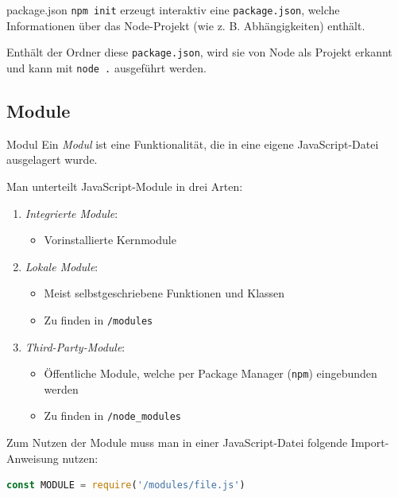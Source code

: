 \begin{defi}{package.json}
    \texttt{npm init} erzeugt interaktiv eine \texttt{package.json}, welche Informationen über das Node-Projekt (wie z. B. Abhängigkeiten) enthält.

    Enthält der Ordner diese \texttt{package.json}, wird sie von Node als Projekt erkannt und kann mit \texttt{node .} ausgeführt werden.
\end{defi}

\subsection{Module}

\begin{defi}{Modul}
    Ein \emph{Modul} ist eine Funktionalität, die in eine eigene JavaScript-Datei ausgelagert wurde.

    Man unterteilt JavaScript-Module in drei Arten:
    \begin{enumerate}
        \item \emph{Integrierte Module}:
              \begin{itemize}
                  \item Vorinstallierte Kernmodule
              \end{itemize}
        \item \emph{Lokale Module}:
              \begin{itemize}
                  \item Meist selbstgeschriebene Funktionen und Klassen
                  \item Zu finden in \texttt{/modules}
              \end{itemize}
        \item \emph{Third-Party-Module}:
              \begin{itemize}
                  \item Öffentliche Module, welche per Package Manager (\texttt{npm}) eingebunden werden
                  \item Zu finden in \texttt{/node\_modules}
              \end{itemize}
    \end{enumerate}

    Zum Nutzen der Module muss man in einer JavaScript-Datei folgende Import-Anweisung nutzen:
    \begin{lstlisting}[language=JavaScript]
        const MODULE = require('/modules/file.js')
    \end{lstlisting}
\end{defi}

